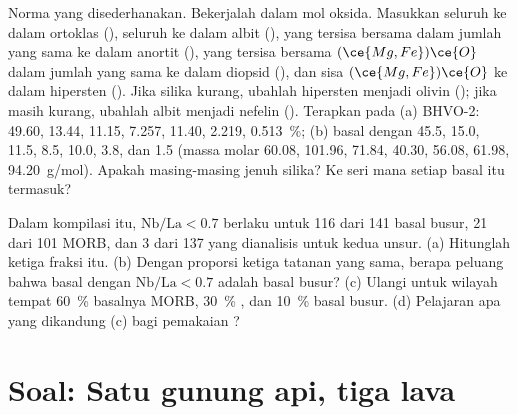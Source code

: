 \begin{exercise}[$\star\star\star$]\label{exo:b2:magmatic-series:11}
Norma yang disederhanakan. Bekerjalah dalam mol oksida. Masukkan seluruh  ke dalam ortoklas
(), seluruh  ke dalam albit (),
 yang tersisa bersama  dalam jumlah yang sama ke dalam anortit (),
 yang tersisa bersama $(\ce{Mg,Fe})\ce{O}$ dalam jumlah yang sama ke dalam diopsid
(), dan sisa $(\ce{Mg,Fe})\ce{O}$ ke dalam hipersten
(). Jika silika kurang, ubahlah hipersten menjadi olivin
(); jika masih kurang, ubahlah albit menjadi nefelin
(). Terapkan pada (a) BHVO-2:  49.60,  13.44,
 11.15,  7.257,  11.40,  2.219, 
\qty{0.513}{\percent}; (b) basal dengan 45.5, 15.0, 11.5, 8.5, 10.0, 3.8, dan 1.5 (massa
molar  60.08,  101.96,  71.84,  40.30, 
56.08,  61.98,  \qty{94.20}{g/mol}). Apakah masing-masing jenuh silika? Ke
seri mana setiap basal itu termasuk?
\end{exercise}

\begin{exercise}[$\star\star\star$]\label{exo:b2:magmatic-series:12}
Dalam kompilasi itu, $\mathrm{Nb}/\mathrm{La} < 0.7$ berlaku untuk 116 dari 141 basal busur,
21 dari 101 MORB, dan 3 dari 137  yang dianalisis untuk kedua unsur. (a) Hitunglah
ketiga fraksi itu. (b) Dengan proporsi ketiga tatanan yang sama, berapa
peluang bahwa basal dengan $\mathrm{Nb}/\mathrm{La} < 0.7$ adalah basal busur? (c)
Ulangi untuk wilayah tempat \qty{60}{\percent} basalnya MORB, \qty{30}{\percent}
, dan \qty{10}{\percent} basal busur. (d) Pelajaran apa yang dikandung (c)
bagi pemakaian ?
\end{exercise}

\section{Soal: Satu gunung api, tiga lava}

